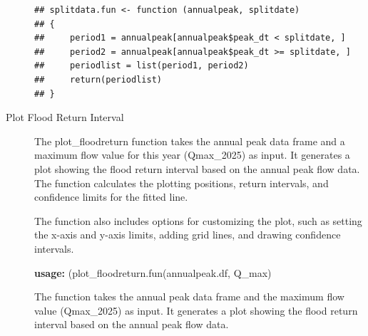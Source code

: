 \documentclass{tufte-handout}\usepackage[]{graphicx}\usepackage[]{xcolor}
\makeatletter
\newenvironment{kframe}{%
 \def\at@end@of@kframe{}%
 \ifinner\ifhmode%
  \def\at@end@of@kframe{\end{minipage}}%
  \begin{minipage}{\columnwidth}%
 \fi\fi%
 \def\FrameCommand##1{\hskip\@totalleftmargin \hskip-\fboxsep
 \colorbox{shadecolor}{##1}\hskip-\fboxsep
     \hskip-\linewidth \hskip-\@totalleftmargin \hskip\columnwidth}%
 \MakeFramed {\advance\hsize-\width
   \@totalleftmargin\z@ \linewidth\hsize
   \@setminipage}}%
 {\par\unskip\endMakeFramed%
 \at@end@of@kframe}
\newenvironment{knitrout}{}{} %
\makeatother
\begin{document}
\begin{description}
\begin{knitrout}
\color{fgcolor}\begin{kframe}
\begin{verbatim}
## splitdata.fun <- function (annualpeak, splitdate) 
## {
##     period1 = annualpeak[annualpeak$peak_dt < splitdate, ]
##     period2 = annualpeak[annualpeak$peak_dt >= splitdate, ]
##     periodlist = list(period1, period2)
##     return(periodlist)
## }
\end{verbatim}
\end{kframe}
\end{knitrout}

\item[Plot Flood Return Interval]

The plot\_floodreturn function takes the annual peak data frame and a maximum flow value for this year (Qmax\_2025) as input. It generates a plot showing the flood return interval based on the annual peak flow data. The function calculates the plotting positions, return intervals, and confidence limits for the fitted line.

The function also includes options for customizing the plot, such as setting the x-axis and y-axis limits, adding grid lines, and drawing confidence intervals. 

\textbf{usage:} (plot\_floodreturn.fun(annualpeak.df, Q\_max)

The function takes the annual peak data frame and the maximum flow value (Qmax\_2025) as input. It generates a plot showing the flood return interval based on the annual peak flow data. 

\end{description}
\end{document}
